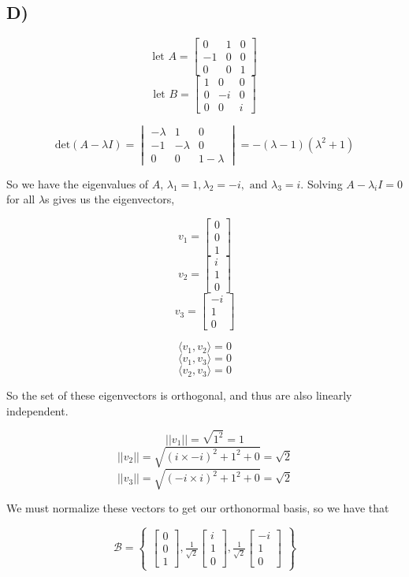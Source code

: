 \documentclass[12pt, letterpaper]{article}
\begin{document}
\subsection*{D)}
\[ \text{let } A = \begin{bmatrix} 0 & 1 & 0 \\ -1 & 0 & 0 \\ 0 & 0 & 1 \end{bmatrix} \]
\[ \text{let } B = \begin{bmatrix} 1 & 0 & 0 \\ 0 & -i & 0 \\ 0 & 0 & i \end{bmatrix} \]

\[ \text{det}(A - \lambda I) = \begin{vmatrix} -\lambda & 1 & 0 \\ -1 & -\lambda & 0 \\ 0 & 0 & 1 - \lambda \end{vmatrix} = -(\lambda - 1)(\lambda^2 + 1) \]

So we have the eigenvalues of $A$, $\lambda_1 = 1, \lambda_2 = -i, \text{ and } \lambda_3 = i$. Solving $A - \lambda_i I = 0$ for all $\lambda$s gives us the eigenvectors, 

\[ v_1 = \begin{bmatrix} 0 \\ 0 \\ 1 \end{bmatrix} \]
\[ v_2 = \begin{bmatrix} i \\ 1 \\ 0 \end{bmatrix} \]
\[ v_3 = \begin{bmatrix} -i \\ 1 \\ 0 \end{bmatrix} \]

\[ \langle v_1, v_2 \rangle = 0 \]
\[ \langle v_1, v_3 \rangle = 0 \]
\[ \langle v_2, v_3 \rangle = 0 \]

So the set of these eigenvectors is orthogonal, and thus are also linearly independent.

\[ ||v_1|| = \sqrt{1^2} = 1 \]
\[ ||v_2|| = \sqrt{(i \times -i)^2 + 1^2 + 0} = \sqrt{2} \]
\[ ||v_3|| = \sqrt{(-i \times i)^2 + 1^2 + 0} = \sqrt{2} \]

We must normalize these vectors to get our orthonormal basis, so we have that

\[ \mathcal{B} = \begin{Bmatrix} \begin{bmatrix} 0 \\ 0 \\ 1 \end{bmatrix}, \frac{1}{\sqrt{2}} \begin{bmatrix} i \\ 1 \\ 0 \end{bmatrix}, \frac{1}{\sqrt{2}} \begin{bmatrix} -i \\ 1 \\ 0 \end{bmatrix} \end{Bmatrix} \]
\end{document}
